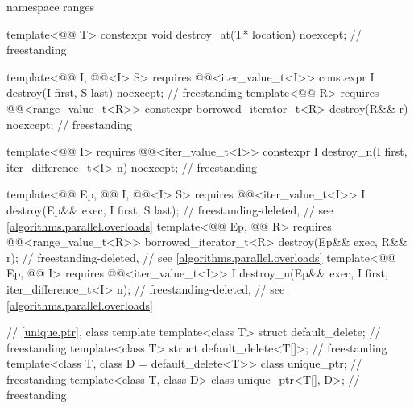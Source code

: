 \begin{codeblock}
{  namespace ranges {
    template<@@ T>
      constexpr void destroy_at(T* location) noexcept;                              // freestanding

    template<@@ I, @@<I> S>
      requires @@<iter_value_t<I>>
        constexpr I destroy(I first, S last) noexcept;                              // freestanding
    template<@@ R>
      requires @@<range_value_t<R>>
        constexpr borrowed_iterator_t<R> destroy(R&& r) noexcept;                   // freestanding

    template<@@ I>
      requires @@<iter_value_t<I>>
        constexpr I destroy_n(I first, iter_difference_t<I> n) noexcept;            // freestanding

    template<@@ Ep, @@ I,
             @@<I> S>
      requires @@<iter_value_t<I>>
        I destroy(Ep&& exec, I first, S last);                              // freestanding-deleted,
                                                                            // see \ref{algorithms.parallel.overloads}
    template<@@ Ep, @@ R>
      requires @@<range_value_t<R>>
        borrowed_iterator_t<R> destroy(Ep&& exec, R&& r);                   // freestanding-deleted,
                                                                            // see \ref{algorithms.parallel.overloads}
    template<@@ Ep, @@ I>
      requires @@<iter_value_t<I>>
        I destroy_n(Ep&& exec, I first, iter_difference_t<I> n);            // freestanding-deleted,
                                                                            // see \ref{algorithms.parallel.overloads}
  }

  // \ref{unique.ptr}, class template 
  template<class T> struct default_delete;                                          // freestanding
  template<class T> struct default_delete<T[]>;                                     // freestanding
  template<class T, class D = default_delete<T>> class unique_ptr;                  // freestanding
  template<class T, class D> class unique_ptr<T[], D>;                              // freestanding

}
\end{codeblock}
